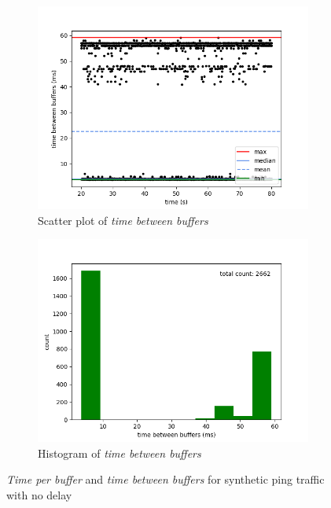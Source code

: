 \begin{figure}[H]
    \begin{subfigure}[t]{0.5\textwidth}
        \centering
        \includegraphics[scale=0.45]{img/synthetic_pings_no_wait_between_buffers_scatter.png}
        \caption{Scatter plot of \textit{time between buffers}}
    \end{subfigure}%
    \begin{subfigure}[t]{0.5\textwidth}
        \centering
        \includegraphics[scale=0.45]{img/synthetic_pings_no_wait_between_buffers_hist.png}
        \caption{Histogram of \textit{time between buffers}}
    \end{subfigure}

    \caption{\textit{Time per buffer} and \textit{time between buffers} for synthetic ping traffic with no delay}
    \label{evaluation/results/synthetic-ping-instructions-no-delay/plots}
\end{figure}

